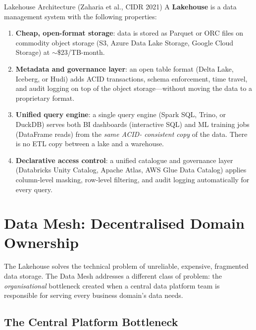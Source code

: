 \begin{defbox}{Lakehouse Architecture (Zaharia et al., CIDR 2021)}
A \textbf{Lakehouse} is a data management system with the following
properties:
\begin{enumerate}
  \item \textbf{Cheap, open-format storage}: data is stored as Parquet
        or ORC files on commodity object storage (S3, Azure Data Lake
        Storage, Google Cloud Storage) at $\sim$\$23/TB-month.
  \item \textbf{Metadata and governance layer}: an open table format
        (Delta Lake, Iceberg, or Hudi) adds ACID transactions, schema
        enforcement, time travel, and audit logging on top of the
        object storage---without moving the data to a proprietary format.
  \item \textbf{Unified query engine}: a single query engine (Spark SQL,
        Trino, or DuckDB) serves both BI dashboards (interactive SQL)
        and ML training jobs (DataFrame reads) from the \emph{same ACID-
        consistent copy} of the data. There is no ETL copy between a
        lake and a warehouse.
  \item \textbf{Declarative access control}: a unified catalogue and
        governance layer (Databricks Unity Catalog, Apache Atlas,
        AWS Glue Data Catalog) applies column-level masking, row-level
        filtering, and audit logging automatically for every query.
\end{enumerate}
\end{defbox}

\section{Data Mesh: Decentralised Domain Ownership}
\label{sec:data-mesh}

The Lakehouse solves the technical problem of unreliable, expensive,
fragmented data storage. The Data Mesh \autocite{Dehghani2022} addresses
a different class of problem: the \emph{organisational} bottleneck created
when a central data platform team is responsible for serving every business
domain's data needs.

\subsection{The Central Platform Bottleneck}
\label{subsec:mesh-problem}

